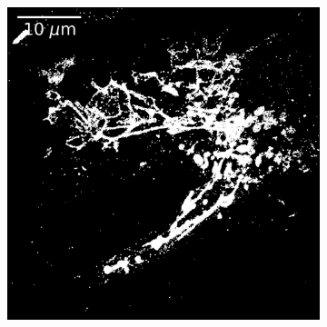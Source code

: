 \begin{figure}[htbp]
    \begin{subfigure}{0.49\textwidth}
        \includegraphics[width=\textwidth]{figures/mitochondria_image9.png}
        \caption{}
    \end{subfigure}
    \begin{subfigure}{0.49\textwidth}

\end{subfigure}
\end{figure}
